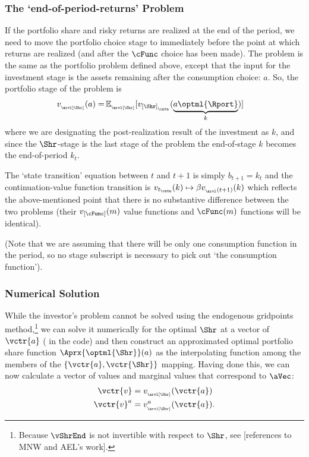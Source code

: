 \documentclass[titlepage, headings=optiontotocandhead]{Resources/texmf-local/tex/latex/econtex}
\begin{document}
\subsubsection{The `end-of-period-returns' Problem}

If the portfolio share and risky returns are realized at the end of the {period}, we need to move the portfolio choice {stage} to immediately before the point at which returns are realized (and after the $\cFunc$ choice has been made).  The problem is the same as the portfolio problem defined above, except that the input for the investment {stage} is the assets remaining after the consumption choice: $a$.  So, the portfolio {stage} of the problem is
\begin{equation}\begin{gathered}\begin{aligned}
  v_{_\arvl[\Shr]}(a) = & \Ex_{_\arvl[\Shr]}[v_{[\Shr]_{_\cntn}}(\underbrace{a\optml{\Rport}}_{k})] %
    \end{aligned}\end{gathered}\end{equation}
where we are designating the post-realization result of the investment as $k$, and since the $\Shr$-{stage} is the last {stage} of the problem the end-of-{stage} $k$ becomes the end-of-{period} $k_{t}.$ 

The `state transition' equation between $t$ and $t+1$ is simply $b_{t+1} = k_{t}$ and the continuation-value function transition is $v_{t_\cntn}(k) \mapsto \beta v_{_\arvl(t+1)}(k)$ which reflects the above-mentioned point that there is no substantive difference between the two problems (their $v_{[\cFunc]}(m)$ value functions and $\cFunc(m)$ functions will be identical).

(Note that we are assuming that there will be only one consumption function in the period, so no {stage} subscript is necessary to pick out `the consumption function'). 

\subsubsection{Numerical Solution}
While the investor's problem cannot be solved using the endogenous gridpoints method,\footnote{Because $\vShrEnd$ is not invertible with respect to $\Shr$, see [references to MNW and AEL's work].} 
we can solve it numerically for the optimal $\Shr$ at a vector of $\vctr{a}$ ({\aVecCode} in the code)  and then construct an approximated optimal portfolio share function $\Aprx{\optml{\Shr}}(a)$ as the interpolating function among the members of the $\{\vctr{a},\vctr{\Shr}\}$ mapping.  Having done this, we can now calculate a vector of values and marginal values that correspond to $\aVec$:
\begin{equation}\begin{gathered}\begin{aligned}
      \vctr{v}  & = v_{_\arvl[\Shr]}(\vctr{a}) \label{eq:vShrEnd}
\\      \vctr{v}^a  & = v^{a}_{_\arvl[\Shr]}(\vctr{a}).
    \end{aligned}\end{gathered}\end{equation}
\end{document}
